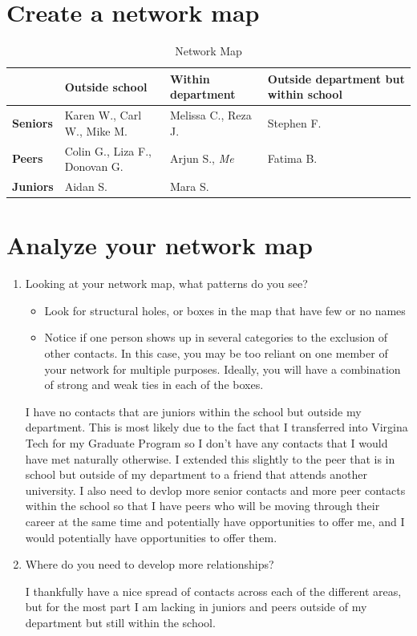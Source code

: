 \documentclass[12pt]{article}
\begin{document}
\section{Create a network map}

\begin{table}[h]
\centering
\begin{tabular}{|l|p{3.5cm}|p{3.5cm}|p{3.5cm}|}
\hline
 & \textbf{Outside school} & \textbf{Within department} & \textbf{Outside department but within school} \\
\hline
\textbf{Seniors} & Karen W., Carl W., Mike M. & Melissa C., Reza J. & Stephen F. \\
\hline
\textbf{Peers} & Colin G., Liza F., Donovan G. & Arjun S., \textit{Me} & Fatima B. \\
\hline
\textbf{Juniors} & Aidan S. & Mara S. & \\
\hline
\end{tabular}
\caption{Network Map}
\label{tab:networkmap}
\end{table}

\section{Analyze your network map}

\begin{enumerate}
    \item Looking at your network map, what patterns do you see?
    \begin{itemize}
        \item Look for structural holes, or boxes in the map that have few or no names
        \item Notice if one person shows up in several categories to the exclusion of other contacts.
        In this case, you may be too reliant on one member of your network for multiple purposes. 
        Ideally, you will have a combination of strong and weak ties in each of the boxes.
    \end{itemize}

    I have no contacts that are juniors within the school but outside my department. This is 
    most likely due to the fact that I transferred into Virgina Tech for my Graduate Program 
    so I don't have any contacts that I would have met naturally otherwise. I extended this slightly 
    to the peer that is in school but outside of my department to a friend that attends another 
    university. I also need to devlop more senior contacts and more peer contacts within the school 
    so that I have peers who will be moving through their career at the same time and potentially 
    have opportunities to offer me, and I would potentially have opportunities to offer them.

    \item Where do you need to develop more relationships?
    
    I thankfully have a nice spread of contacts across each of the different areas, but for the most part 
    I am lacking in juniors and peers outside of my department but still within the school.
\end{enumerate}
\end{document}
